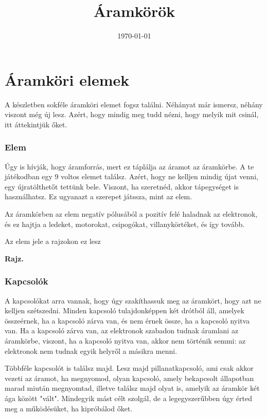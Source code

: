 \documentclass[16pt]{scrreprt}
\title{Áramkörök}
\date{\today}
\author{}
\begin{document}
\maketitle

\section{Áramköri elemek}

A készletben sokféle áramköri elemet fogsz találni. Néhányat már ismersz, néhány viszont még új lesz. Azért, hogy mindig meg tudd nézni, hogy melyik mit csinál, itt áttekintjük őket.

\subsubsection{Elem}

Úgy is hívják, hogy áramforrás, mert ez táplálja az áramot az áramkörbe. A te játékodban egy 9 voltos elemet találsz. Azért, hogy ne kelljen mindig újat venni, egy újratölthetőt tettünk bele. Viszont, ha szeretnéd, akkor tápegységet is használhatsz. Ez ugyanazt a szerepet játssza, mint az elem. 



Az áramkörben az elem negatív pólusából a pozitív felé haladnak az elektronok, és ez hajtja a ledeket, motorokat, csipogókat, villanykörtéket, és így tovább. 

Az elem jele a rajzokon ez lesz

\textbf{Rajz.}

\subsubsection{Kapcsolók}

A kapcsolókat arra vannak, hogy úgy szakíthassuk meg az áramkört, hogy azt ne kelljen szétszedni. Minden kapcsoló tulajdonképpen két drótból áll, amelyek összeérnek, ha a kapcsoló zárva van, és nem érnek össze, ha a kapcsoló nyitva van. Ha a kapcsoló zárva van, az elektronok szabadon tudnak áramlani az áramkörbe, viszont, ha a kapcsoló nyitva van, akkor nem történik semmi: az elektronok nem tudnak egyik helyről a másikra menni. 

Többféle kapcsolót is találsz majd. Lesz majd pillanatkapcsoló, ami csak akkor vezeti az áramot, ha megnyomod, olyan kapcsoló, amely bekapcsolt állapotban marad miután megnyomtad, illetve találsz majd olyat is, amelyik az áramkör két ága között "vált". Mindegyik mást célt szolgál, de a legegyszerűbben úgy érted meg a működésüket, ha kipróbálod őket.
\end{document}
